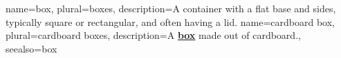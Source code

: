 
\let\oldgls\gls
\let\oldglspl\glspl
\let\oldglsxtrshortpl\glsxtrshortpl

\renewcommand{\gls}[1]{\textbf{\uline{\oldgls{#1}}}}
\renewcommand{\glspl}[1]{\textbf{\uline{\oldglspl{#1}}}}
\renewcommand{\glsxtrshortpl}[1]{\textbf{\uline{\oldglsxtrshortpl{#1}}}}

\renewcommand\glsseeformat[3][\seename]
{
    \\*
    \emph{#1} \textbf{\uline{\glsseelist{#2}}}
}

\makeglossaries

{
    name=box,
    plural=boxes,
    description={A container with a flat base and sides, typically square or
    rectangular, and often having a lid.}
}
{
    name=cardboard box,
    plural=cardboard boxes,
    description={A \gls{box} made out of cardboard.},
    seealso={box}
}


